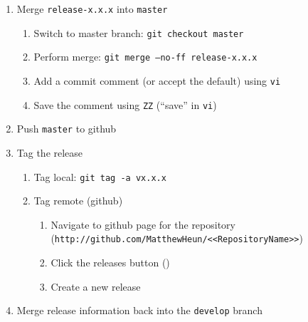 \documentclass{article}
\begin{document}
\begin{enumerate}

  \item Merge \texttt{release-x.x.x} into \texttt{master}
  \begin{enumerate}

    \item Switch to master branch: \texttt{git checkout master} 

    \item Perform merge: \texttt{git merge --no-ff release-x.x.x}
	
	\item Add a commit comment (or accept the default) using \texttt{vi} 
	
	\item Save the comment using \texttt{ZZ} (``save'' in \texttt{vi})

  \end{enumerate}
  \item Push \texttt{master} to github
  
  \item Tag the release
  \begin{enumerate}

    \item Tag local: \texttt{git tag -a vx.x.x}

    \item Tag remote (github)
	\begin{enumerate}

	  \item Navigate to github page for the repository\\
	  		(\texttt{http://github.com/MatthewHeun/<<RepositoryName>>})

	  \item Click the releases button ()
	  
	  \item Create a new release

	\end{enumerate}

  \end{enumerate}
  \item Merge release information back into the \texttt{develop} branch
  \begin{enumerate}


\end{enumerate}
\end{enumerate}
\end{document}
